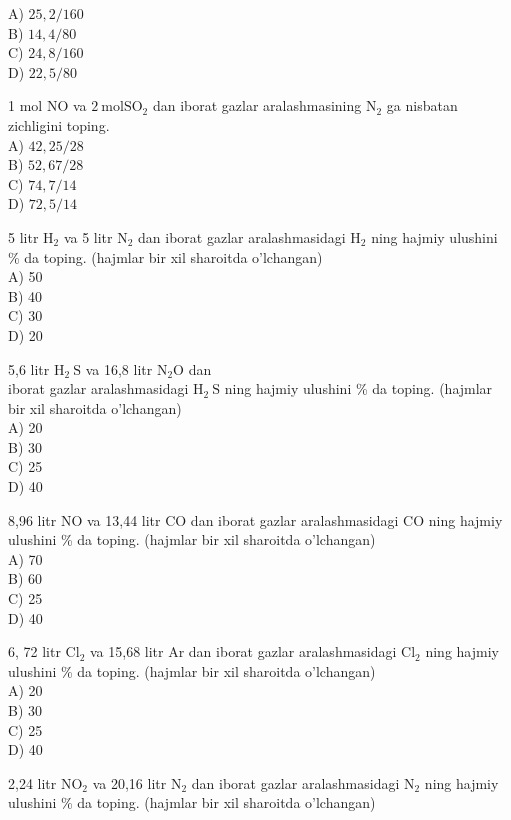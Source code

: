 A) $25,2 / 160$\\
B) $14,4 / 80$\\
C) $24,8 / 160$\\
D) $22,5 / 80$
  \item 1 mol NO va $2 \mathrm{~mol} \mathrm{SO}_{2}$ dan iborat gazlar aralashmasining $\mathrm{N}_{2}$ ga nisbatan zichligini toping.\\
A) $42,25 / 28$\\
B) $52,67 / 28$\\
C) $74,7 / 14$\\
D) $72,5 / 14$
  \item 5 litr $\mathrm{H}_{2}$ va 5 litr $\mathrm{N}_{2}$ dan iborat gazlar aralashmasidagi $\mathrm{H}_{2}$ ning hajmiy ulushini \% da toping. (hajmlar bir xil sharoitda o'lchangan)\\
A) 50\\
B) 40\\
C) 30\\
D) 20\\
  \item 5,6 litr $\mathrm{H}_{2} \mathrm{~S}$ va 16,8 litr $\mathrm{N}_{2} \mathrm{O}$ dan\\
iborat gazlar aralashmasidagi $\mathrm{H}_{2} \mathrm{~S}$ ning hajmiy ulushini \% da toping. (hajmlar bir xil sharoitda o'lchangan)\\
A) 20\\
B) 30\\
C) 25\\
D) 40
  \item 8,96 litr NO va 13,44 litr CO dan iborat gazlar aralashmasidagi CO ning hajmiy ulushini \% da toping. (hajmlar bir xil sharoitda o'lchangan)\\
A) 70\\
B) 60\\
C) 25\\
D) 40
  \item 6, 72 litr $\mathrm{Cl}_{2}$ va 15,68 litr Ar dan iborat gazlar aralashmasidagi $\mathrm{Cl}_{2}$ ning hajmiy ulushini \% da toping. (hajmlar bir xil sharoitda o'lchangan)\\
A) 20\\
B) 30\\
C) 25\\
D) 40
  \item 2,24 litr $\mathrm{NO}_{2}$ va 20,16 litr $\mathrm{N}_{2}$ dan iborat gazlar aralashmasidagi $\mathrm{N}_{2}$ ning hajmiy ulushini \% da toping. (hajmlar bir xil sharoitda o'lchangan)\\

